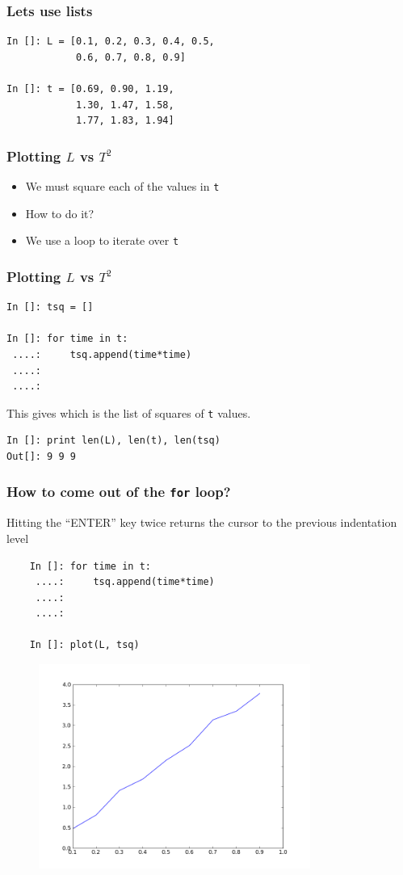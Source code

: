 \documentclass[14pt,compress]{beamer}
\newcounter{time}
\newcommand{\typ}[1]{\lstinline{#1}}
\newcommand{\kwrd}[1]{ \texttt{\textbf{\color{blue}{#1}}}  }
\begin{document}
\begin{frame}[fragile]
\frametitle{Lets use lists}
\begin{lstlisting}
In []: L = [0.1, 0.2, 0.3, 0.4, 0.5, 
            0.6, 0.7, 0.8, 0.9]

In []: t = [0.69, 0.90, 1.19, 
            1.30, 1.47, 1.58, 
            1.77, 1.83, 1.94]
\end{lstlisting}
\end{frame}

\begin{frame}[fragile]
\frametitle{Plotting $L$ vs $T^2$}
\begin{itemize}
\item We must square each of the values in \typ{t}
\item How to do it?
\item We use a \kwrd{for} loop to iterate over \typ{t}
\end{itemize}
\end{frame}

\begin{frame}[fragile]
\frametitle{Plotting $L$ vs $T^2$}
\begin{lstlisting}
In []: tsq = []

In []: for time in t:
 ....:     tsq.append(time*time)
 ....:
 ....:

\end{lstlisting}
This gives \kwrd{tsq} which is the list of squares of \typ{t} values.
\begin{lstlisting}
In []: print len(L), len(t), len(tsq)
Out[]: 9 9 9
\end{lstlisting}
\end{frame}

\begin{frame}[fragile]
  \frametitle{How to come out of the \texttt{for} loop?}
  Hitting the ``ENTER'' key twice returns the cursor to the previous indentation level
  \begin{lstlisting}
    In []: for time in t:
     ....:     tsq.append(time*time)
     ....:     
     ....:     

    In []: plot(L, tsq)
  \end{lstlisting}
\end{frame}

\begin{frame}[fragile]
\begin{figure}
\includegraphics[width=3.5in]{data/L-TSq-limited.png}
\end{figure}
\end{frame}
\end{document}
